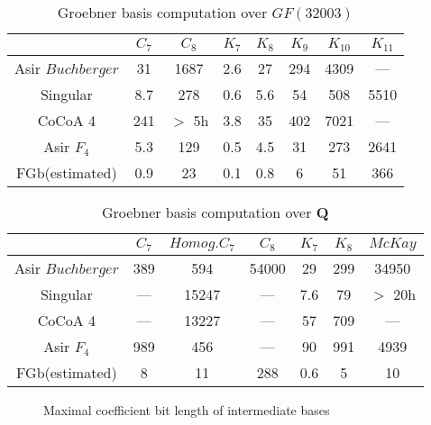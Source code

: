 \documentclass[runningheads]{cl2emult}
\begin{document}
\begin{table}[hbtp]
\begin{center}
\begin{tabular}{|c||c|c|c|c|c|c|c|} \hline
		& $C_7$ & $C_8$ & $K_7$ & $K_8$ & $K_9$ & $K_{10}$ & $K_{11}$ \\ \hline
Asir $Buchberger$	& 31 & 1687  & 2.6  & 27 & 294  & 4309 & --- \\ \hline
Singular & 8.7 & 278 & 0.6 & 5.6 & 54 & 508 & 5510 \\ \hline
CoCoA 4 & 241 & $>$ 5h & 3.8 & 35 & 402 &7021  & --- \\ \hline\hline
Asir $F_4$	& 5.3 & 129 & 0.5  & 4.5 & 31  & 273 & 2641 \\ \hline
FGb(estimated)	& 0.9 & 23 & 0.1 & 0.8 & 6 & 51 & 366 \\ \hline
\end{tabular}
\end{center}
\caption{Groebner basis computation over $GF(32003)$}
\label{gbmod}
\end{table}

\begin{table}[hbtp]
\begin{center}
\begin{tabular}{|c||c|c|c|c|c|c|} \hline
		& $C_7$ & $Homog. C_7$ & $C_8$ & $K_7$ & $K_8$ & $McKay$ \\ \hline
Asir $Buchberger$ 	& 389 & 594 & 54000 & 29 & 299 & 34950 \\ \hline
Singular & --- & 15247 & --- & 7.6 & 79 & $>$ 20h \\ \hline
CoCoA 4 & --- & 13227 & --- & 57 & 709 & --- \\ \hline\hline
Asir $F_4$ 	&  989 & 456 & --- & 90 & 991 & 4939 \\ \hline
FGb(estimated)	& 8 &11 & 288 &  0.6 & 5 & 10 \\ \hline
\end{tabular}
\end{center}
\caption{Groebner basis computation over {\bf Q}}
\label{gbq}
\end{table}

\begin{figure}[hbtp]
\begin{center}
\epsfxsize=12cm
\end{center}
\caption{Maximal coefficient bit length of intermediate bases}
\label{f4vsbuch}
\end{figure}
\end{document}
